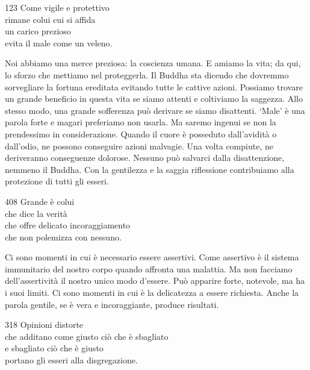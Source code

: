 
\begin{dhpVerse}{123}
\label{dhp-123}
Come vigile e protettivo\\
rimane colui cui si affida\\
un carico prezioso\\
evita il male come un veleno.
\end{dhpVerse}

\begin{dhpRefl}
  Noi abbiamo una merce preziosa: la coscienza umana. E amiamo la vita; da qui,
  lo sforzo che mettiamo nel proteggerla. Il Buddha sta dicendo che dovremmo
  sorvegliare la fortuna ereditata evitando tutte le cattive azioni. Possiamo
  trovare un grande beneficio in questa vita se siamo attenti e coltiviamo la
  saggezza. Allo stesso modo, una grande sofferenza può derivare se siamo
  disattenti. `Male' è una parola forte e magari preferiamo non usarla. Ma
  saremo ingenui se non la prendessimo in considerazione. Quando il cuore è
  posseduto dall'avidità o dall'odio, ne possono conseguire azioni malvagie. Una
  volta compiute, ne deriveranno conseguenze dolorose. Nessuno può salvarci
  dalla disattenzione, nemmeno il Buddha. Con la gentilezza e la saggia
  riflessione contribuiamo alla protezione di tutti gli esseri.
\end{dhpRefl}


\begin{dhpVerse}{408}
\label{dhp-408}
Grande è colui\\
che dice la verità\\
che offre delicato incoraggiamento\\
che non polemizza con nessuno.
\end{dhpVerse}

\begin{dhpRefl}
  Ci sono momenti in cui è necessario essere assertivi. Come assertivo è il
  sistema immunitario del nostro corpo quando affronta una malattia. Ma non
  facciamo dell'assertività il nostro unico modo d'essere. Può apparire forte,
  notevole, ma ha i suoi limiti. Ci sono momenti in cui è la delicatezza a
  essere richiesta. Anche la parola gentile, se è vera e incoraggiante, produce
  risultati.
\end{dhpRefl}


\begin{dhpVerse}{318}
\label{dhp-318}
Opinioni distorte\\
che additano come giusto ciò che è sbagliato\\
e sbagliato ciò che è giusto\\
portano gli esseri alla disgregazione.
\end{dhpVerse}

